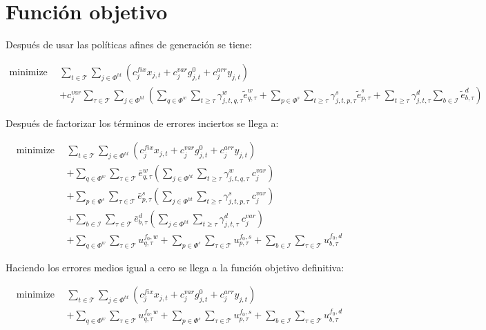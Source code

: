 \chapter{Función objetivo}

Después de usar las políticas afines de generación se tiene:

\begin{align*}
\text{minimize} \ \ & \sum_{t\in\mathcal{T}}\sum_{j\in\Phi^{ht}} {\left( c^{fix}_{j}x_{j,t} + c^{var}_{j}g_{j,t}^{0} + c^{arr}_{j}y_{j,t} \right)} \nonumber \\
& +c^{var}_{j} \sum_{\tau\in\mathcal{T}}\sum_{j\in\Phi^{ht}} {\left( \sum_{q \in \Phi^{w}}\sum_{t \ge \tau} \gamma_{j,t,q,\tau}^{w}\tilde{e}_{q,\tau}^{w} + \sum_{p \in \Phi^{s}}\sum_{t \ge \tau} \gamma_{j,t,p,\tau}^{s}\tilde{e}_{p,\tau}^{s} + \sum_{t \ge \tau}  \gamma_{j,t,\tau}^{d} \sum_{b \in \mathcal{I}}{\tilde{e}_{b,\tau}^{d}} \right)}
\end{align*}

Después de factorizar los términos de errores inciertos se llega a:

\begin{align*}
\text{minimize} \ \ & \sum_{t\in\mathcal{T}}\sum_{j\in\Phi^{ht}} {\left( c^{fix}_{j}x_{j,t} + c^{var}_{j}g_{j,t}^{0} + c^{arr}_{j}y_{j,t} \right)} \\
& + \sum_{q \in \Phi^{w}} \sum_{\tau\in\mathcal{T}} \bar{e}_{q,\tau}^{w} \left( \sum_{j\in\Phi^{ht}} \sum_{t \ge \tau} \gamma_{j,t,q,\tau}^{w} \: c^{var}_{j} \right) \\
& + \sum_{p \in \Phi^{s}} \sum_{\tau\in\mathcal{T}} \bar{e}_{p,\tau}^{s} \left( \sum_{j\in\Phi^{ht}} \sum_{t \ge \tau} \gamma_{j,t,p,\tau}^{s} \: c^{var}_{j} \right) \\
& + \sum_{b \in \mathcal{I}} \sum_{\tau\in\mathcal{T}} \bar{e}_{b,\tau}^{d} \left( \sum_{j\in\Phi^{ht}} \sum_{t \ge \tau} \gamma_{j,t,\tau}^{d} \: c^{var}_{j} \right)\\
&+ \sum_{q \in \Phi^{w}} \sum_{\tau\in\mathcal{T}} u_{q,\tau}^{f_0, w} + \sum_{p \in \Phi^{s}} \sum_{\tau\in\mathcal{T}} u_{p,\tau}^{f_0, s} + \sum_{b \in \mathcal{I}} \sum_{\tau\in\mathcal{T}} u_{b,\tau}^{f_0, d}
\end{align*}

Haciendo los errores medios igual a cero se llega a la función objetivo definitiva:

\begin{align}
\text{minimize} \ \ & \sum_{t\in\mathcal{T}}\sum_{j\in\Phi^{ht}} {\left( c^{fix}_{j}x_{j,t} + c^{var}_{j}g_{j,t}^{0} + c^{arr}_{j}y_{j,t} \right)} \\
& + \sum_{q \in \Phi^{w}} \sum_{\tau\in\mathcal{T}} u_{q,\tau}^{f_0, w} + \sum_{p \in \Phi^{s}} \sum_{\tau\in\mathcal{T}} u_{p,\tau}^{f_0, s} + \sum_{b \in \mathcal{I}} \sum_{\tau\in\mathcal{T}} u_{b,\tau}^{f_0, d} \nonumber
\end{align}

